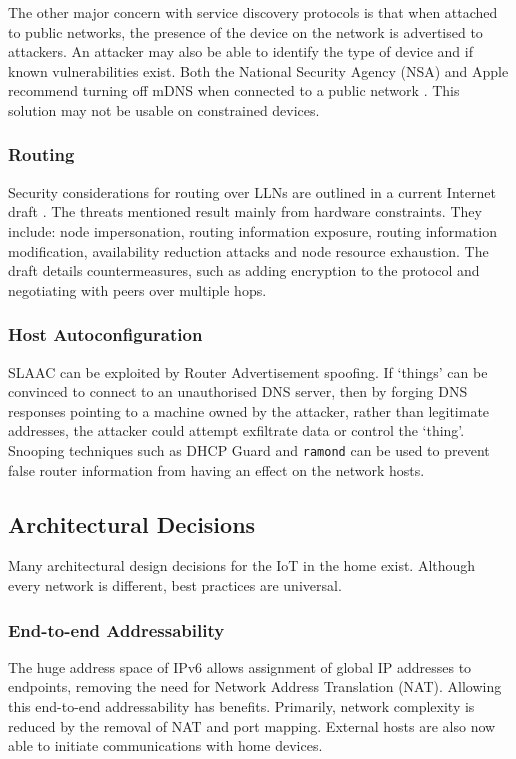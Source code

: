 \documentclass[10pt,journal,compsoc]{IEEEtran}
\begin{document}
The other major concern with service discovery protocols is that when attached
to public networks, the presence of the device on the network is advertised to
attackers. An attacker may also be able to identify the type of device and if
known vulnerabilities exist. Both the National Security Agency (NSA) and Apple
recommend turning off mDNS when connected to a public network
\cite{NSAMacHardening} \cite{MacConfig}. This solution may not be usable on
constrained devices.

\subsubsection{Routing}
Security considerations for routing over LLNs are outlined in a current
Internet draft \cite{Tsao2014}. The threats mentioned result mainly from
hardware constraints. They include: node impersonation, routing information
exposure, routing information modification, availability reduction attacks and
node resource exhaustion. The draft details countermeasures, such as adding
encryption to the protocol and negotiating with peers over multiple hops.

\subsubsection{Host Autoconfiguration}
SLAAC can be exploited by Router Advertisement spoofing. If `things' can be
convinced to connect to an unauthorised DNS server, then by forging DNS
responses pointing to a machine owned by the attacker, rather than legitimate
addresses, the attacker could attempt exfiltrate data or control the `thing'.
Snooping techniques such as DHCP Guard and {\tt ramond} can be used to prevent
false router information from having an effect on the network hosts.

\subsection{Architectural Decisions}
Many architectural design decisions for the IoT in the home exist. Although
every network is different, best practices are universal. 

\subsubsection{End-to-end Addressability}
The huge address space of IPv6 allows assignment of global IP addresses to
endpoints, removing the need for Network Address Translation (NAT). Allowing
this end-to-end addressability has benefits. Primarily, network complexity is
reduced by the removal of NAT and port mapping. External hosts are also now
able to initiate communications with home devices.
\end{document}

